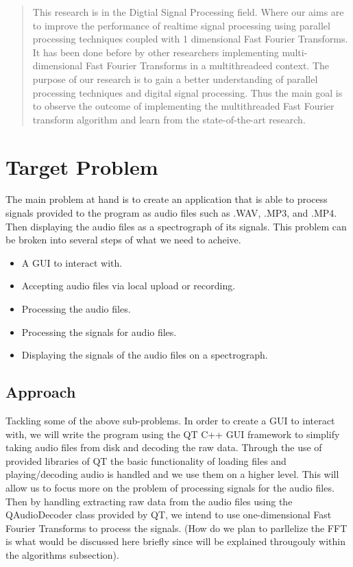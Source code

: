 \documentclass[journal]{IEEEtran}
\begin{document}
\maketitle

\begin{abstract}
This research is in the Digtial Signal Processing field. Where our aims are to improve the performance of realtime
 signal processing using parallel processing techniques coupled with 1 dimensional Fast Fourier Transforms.
 It has been done before by other researchers implementing multi-dimensional Fast Fourier Transforms in a
 multithreadeed context. The purpose of our research is to gain a better understanding of parallel processing
 techniques and digital signal processing. Thus the main goal is to observe the outcome of implementing the
 multithreaded Fast Fourier transform algorithm and learn from the state-of-the-art research.
\end{abstract}

\section{Target Problem}
The main problem at hand is to create an application that is able to process signals provided to the program as audio 
files such as .WAV, .MP3, and .MP4. Then displaying the audio files as a spectrograph of its signals. This problem 
can be broken into several steps of what we need to acheive.
\begin{itemize}
	\item A GUI to interact with.
	\item Accepting audio files via local upload or recording.
	\item Processing the audio files.
	\item Processing the signals for audio files.
	\item Displaying the signals of the audio files on a spectrograph.
\end{itemize}

\subsection{Approach}
Tackling some of the above sub-problems. In order to create a GUI to interact with, we will write the program using 
the QT C++ GUI framework to simplify taking audio files from disk and decoding the raw data. Through the use of provided libraries of QT 
the basic functionality of loading files and playing/decoding audio is handled and we use them on a higher level. This will 
allow us to focus more on the problem of processing signals for the audio files. Then by handling extracting 
raw data from the audio files using the QAudioDecoder class provided by QT, we intend to use one-dimensional Fast Fourier Transforms to 
process the signals. (How do we plan to parllelize the FFT is what would be discussed here briefly since will be 
explained througouly within the algorithms subsection).
\end{document}

